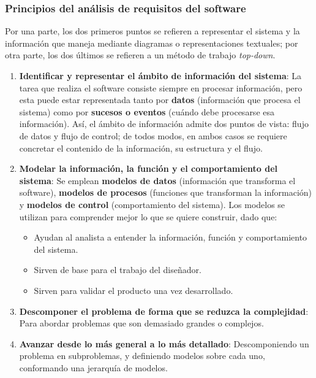 \subsubsection{Principios del análisis de requisitos del software}

Por una parte, los dos primeros puntos se refieren a representar el sistema y la información que maneja mediante diagramas o representaciones textuales; por otra parte, los dos últimos se refieren a un método de trabajo \textit{top-down}.

\begin{enumerate}
    \item \textbf{Identificar y representar el ámbito de información del sistema}: La tarea que realiza el software consiste siempre en procesar información, pero esta puede estar representada tanto por \textbf{datos} (información que procesa el sistema) como por \textbf{sucesos o eventos} (cuándo debe procesarse esa información). Así, el ámbito de información admite dos puntos de vista: flujo de datos y flujo de control; de todos modos, en ambos casos se requiere concretar el contenido de la información, su estructura y el flujo.
    \item \textbf{Modelar la información, la función y el comportamiento del sistema}: Se emplean \textbf{modelos de datos} (información que transforma el software), \textbf{modelos de procesos} (funciones que transforman la información) y \textbf{modelos de control} (comportamiento del sistema). Los modelos se utilizan para comprender mejor lo que se quiere construir, dado que:
          \begin{itemize}
              \item Ayudan al analista a entender la información, función y comportamiento del sistema.
              \item Sirven de base para el trabajo del diseñador.
              \item Sirven para validar el producto una vez desarrollado.
          \end{itemize}
    \item \textbf{Descomponer el problema de forma que se reduzca la complejidad}: Para abordar problemas que son demasiado grandes o complejos.
    \item \textbf{Avanzar desde lo más general a lo más detallado}: Descomponiendo un problema en subproblemas, y definiendo modelos sobre cada uno, conformando una jerarquía de modelos.
\end{enumerate}


